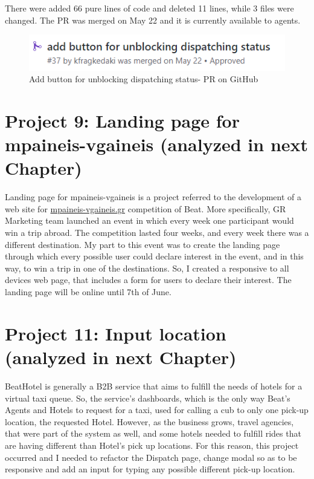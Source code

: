 There were added 66 pure lines of code and deleted 11 lines, while 3 files were changed. The PR was merged on May 22 and it is currently available to agents.

\begin{figure}[H]
	\begin{center}
		\includegraphics[scale=0.85]{images/my_projects/feature-add-add-button-PR.png}
	\end{center}
	\caption{Add button for unblocking dispatching status- PR on GitHub}
\end{figure}

\section{Project 9: Landing page for mpaineis-vgaineis (analyzed in next Chapter)}

Landing page for mpaineis-vgaineis is a project referred to the development of a web site for \url{mpaineis-vgaineis.gr} competition of Beat. More specifically, GR Marketing team launched an event in which every week one participant would win a trip abroad. The competition lasted four weeks, and every week there was a different destination. My part to this event was to create the landing page through which every possible user could declare interest in the event, and in this way, to win a trip in one of the destinations. So, I created a responsive to all devices web page, that includes a form for users to declare their interest. The landing page will be online until 7th of June. \par

\section{Project 11: Input location (analyzed in next Chapter)}

BeatHotel is generally a B2B service that aims to fulfill the needs of hotels for a virtual taxi queue. So, the service's dashboards, which is the only way Beat's Agents and Hotels to request for a taxi, used for calling a cub to only one pick-up location, the requested Hotel. However, as the business grows, travel agencies, that were part of the system as well, and some hotels needed to fulfill rides that are having different than Hotel's pick up locations. For this reason, this project occurred and I needed to refactor the Dispatch page, change modal so as to be responsive and add an input for typing any possible different pick-up location. \par

